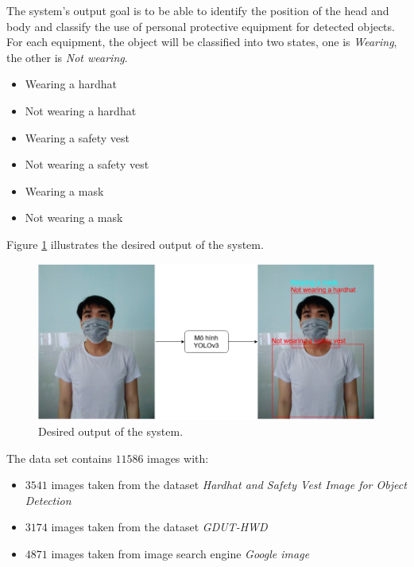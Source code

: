\documentclass[conference]{IEEEtran}
\begin{document}
The system's output goal is to be able to identify the position of the head and body and classify the use of personal protective equipment for detected objects. For each equipment, the object will be classified into two states, one is \emph{Wearing}, the other is \emph{Not wearing}.
\begin{itemize}
	\item Wearing a hardhat
	\item Not wearing a hardhat
	\item Wearing a safety vest
	\item Not wearing a safety vest
	\item Wearing a mask
	\item Not wearing a mask
\end{itemize}
Figure \ref{fig:expected_output} illustrates the desired output of the system.
\begin{figure}[ht!]
	\centerline{\includegraphics[scale=0.25]{images/expected_output.png}}
  	\caption{Desired output of the system.}
  	\label{fig:expected_output}
\end{figure}
The data set contains $ 11586 $ images with:
\begin{itemize}
	\item $3541$ images taken from the dataset \emph{Hardhat and Safety Vest Image for Object Detection}\cite{john:2020:hardhat}
	\item $3174$ images taken from the dataset \emph{GDUT-HWD}\cite{jixiu:2019:automatic}
	\item $4871$ images taken from image search engine \emph{Google image}
\end{itemize}
\end{document}
